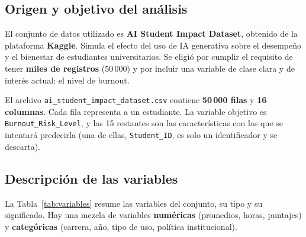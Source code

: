 \documentclass[11pt,letterpaper,twoside]{article}
\begin{document}
\subsection{Origen y objetivo del análisis}
El conjunto de datos utilizado es \textbf{AI Student Impact Dataset}, obtenido de la plataforma \textbf{Kaggle}. Simula el efecto del uso de IA generativa sobre el desempeño y el bienestar de estudiantes universitarios. Se eligió por cumplir el requisito de tener \textbf{miles de registros} (50\,000) y por incluir una variable de clase clara y de interés actual: el nivel de burnout.

El archivo \texttt{ai\_student\_impact\_dataset.csv} contiene \textbf{50\,000 filas} y \textbf{16 columnas}. Cada fila representa a un estudiante. La variable objetivo es \texttt{Burnout\_Risk\_Level}, y las 15 restantes son las características con las que se intentará predecirla (una de ellas, \texttt{Student\_ID}, es solo un identificador y se descarta).

\subsection{Descripción de las variables}
La Tabla~\ref{tab:variables} resume las variables del conjunto, su tipo y su significado. Hay una mezcla de variables \textbf{numéricas} (promedios, horas, puntajes) y \textbf{categóricas} (carrera, año, tipo de uso, política institucional).
\end{document}
